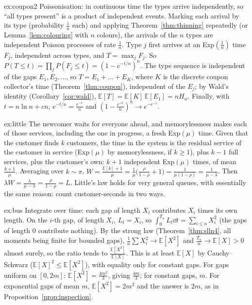 \begin{solution}{ex:coupon2}
\idea Poissonisation: in continuous time the types arrive independently, so ``all types present'' is a product of
independent events.
\writeup Marking each arrival by its type (probability $\frac1n$ each) and applying Theorem~\ref{thm:thinning} repeatedly (or Lemma~\ref{lem:colouring} with $n$ colours),
the arrivals of the $n$ types are independent Poisson processes of rate $\frac1n$. Type $j$ first arrives at an Exp$(\frac1n)$ time $F_j$, independent
across types, and $T=\max_jF_j$. So $P(T\le t)=\prod_jP(F_j\le t)=(1-e^{-t/n})^n$. The type sequence is independent of the gaps $E_1,E_2,\ldots$, so $T=E_1+\dots+E_K$, where
$K$ is the discrete coupon collector's time (Theorem~\ref{thm:coupon}), independent of the $E_j$; by Wald's identity (Corollary~\ref{cor:wald}),
$\mathbb E[T]=\mathbb E[K]\,\mathbb E[E_1]=nH_n$. Finally, with $t=n\ln n+cn$, $e^{-t/n}=\frac{e^{-c}}n$ and $(1-\frac{e^{-c}}n)^n\to e^{-e^{-c}}$.
\end{solution}

\begin{solution}{ex:little}
\idea The newcomer waits for everyone ahead, and memorylessness makes each of those services, including the one in
progress, a fresh Exp$(\mu)$ time.
\writeup Given that the customer finds $k$ customers, the time in the system is the residual service of the customer in service (Exp$(\mu)$ by
memorylessness, if $k\ge1$), plus $k-1$ full services, plus the customer's own: $k+1$ independent Exp$(\mu)$ times, of mean $\frac{k+1}\mu$. Averaging over
$k\sim\pi$, $W=\frac{\mathbb E[k]+1}\mu=\frac1\mu\bigl(\frac\rho{1-\rho}+1\bigr)=\frac1{\mu(1-\rho)}=\frac1{\mu-\lambda}$. Then $\lambda W=\frac\lambda{\mu-\lambda}=\frac\rho{1-\rho}=L$. Little's law holds for very general queues,
with essentially the same reason: count customer-seconds in two ways.
\end{solution}

\begin{solution}{ex:bus}
\idea Integrate over time: each gap of length $X_i$ contributes $X_i$ times its own length.
\writeup On the $i$-th gap, of length $X_i$, $L_t=X_i$, so $\int_0^{T_n}L_t\dd t=\sum_{i\le n}X_i^2$ (the gaps of length $0$ contribute nothing). By the strong law (Theorem~\ref{thm:slln4},
all moments being finite for bounded gaps), $\frac1n\sum X_i^2\to\mathbb E[X^2]$ and $\frac{T_n}n\to\mathbb E[X]>0$ almost surely, so the ratio tends to $\frac{\mathbb E[X^2]}{\mathbb E[X]}$. This is at
least $\mathbb E[X]$ by Cauchy--Schwarz ($\mathbb E[X]^2\le\mathbb E[X^2]$), with equality only for constant gaps. For gaps uniform on $[0,2m]$: $\mathbb E[X^2]=\frac{4m^2}3$, giving $\frac{4m}3$; for
constant gaps, $m$. For exponential gaps of mean $m$, $\mathbb E[X^2]=2m^2$ and the answer is $2m$, as in Proposition~\ref{prop:inspection}.
\end{solution}

